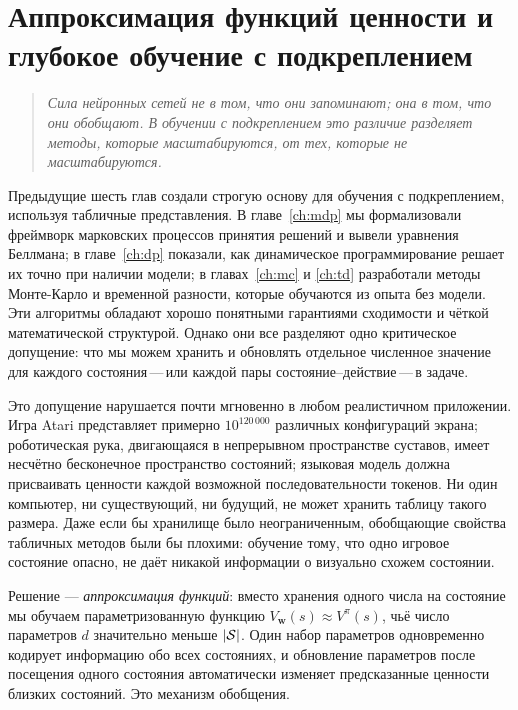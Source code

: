\chapter[Аппроксимация функций ценности]{Аппроксимация функций ценности и глубокое обучение с подкреплением}
\label{ch:value-approx}

\begin{quote}
\itshape
Сила нейронных сетей не в том, что они запоминают; она в том, что они обобщают.
В обучении с подкреплением это различие разделяет методы, которые масштабируются, от тех, которые не масштабируются.
\end{quote}

\bigskip

Предыдущие шесть глав создали строгую основу для обучения с подкреплением, используя табличные представления.  В главе~\ref{ch:mdp} мы формализовали фреймворк марковских процессов принятия решений и вывели уравнения Беллмана; в главе~\ref{ch:dp} показали, как динамическое программирование решает их точно при наличии модели; в главах~\ref{ch:mc} и \ref{ch:td} разработали методы Монте-Карло и временной разности, которые обучаются из опыта без модели.  Эти алгоритмы обладают хорошо понятными гарантиями сходимости и чёткой математической структурой.  Однако они все разделяют одно критическое допущение: что мы можем хранить и обновлять отдельное численное значение для каждого состояния\,---\,или каждой пары состояние--действие\,---\,в задаче.

Это допущение нарушается почти мгновенно в любом реалистичном приложении.  Игра Atari представляет примерно $10^{120\,000}$ различных конфигураций экрана; роботическая рука, двигающаяся в непрерывном пространстве суставов, имеет несчётно бесконечное пространство состояний; языковая модель должна присваивать ценности каждой возможной последовательности токенов.  Ни один компьютер, ни существующий, ни будущий, не может хранить таблицу такого размера.  Даже если бы хранилище было неограниченным, обобщающие свойства табличных методов были бы плохими: обучение тому, что одно игровое состояние опасно, не даёт никакой информации о визуально схожем состоянии.

Решение --- \emph{аппроксимация функций}: вместо хранения одного числа на состояние мы обучаем параметризованную функцию $V_\mathbf{w}(s) \approx V^\pi(s)$, чьё число параметров $d$ значительно меньше $|\mathcal{S}|$.  Один набор параметров одновременно кодирует информацию обо всех состояниях, и обновление параметров после посещения одного состояния автоматически изменяет предсказанные ценности близких состояний.  Это механизм обобщения.

